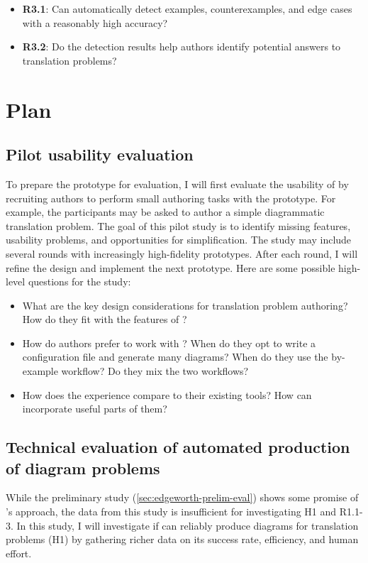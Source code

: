 \begin{itemize}
    \item \textbf{R3.1}: Can \Edgeworth automatically detect examples, counterexamples, and edge cases with a reasonably high accuracy?
    \item \textbf{R3.2}: Do the detection results help authors identify potential answers to translation problems?
\end{itemize}


\section{Plan}

\subsection{Pilot usability evaluation}

To prepare the \Edgeworth prototype for evaluation, I will first evaluate the usability of \Edgeworth by recruiting authors to perform small authoring tasks with the \Edgeworth prototype. For example, the participants may be asked to author a simple diagrammatic translation problem. The goal of this pilot study is to identify missing features, usability problems, and opportunities for simplification. The study may include several rounds with increasingly high-fidelity prototypes. After each round, I will refine the design and implement the next prototype. Here are some possible high-level questions for the study:
\begin{itemize}
    \item What are the key design considerations for translation problem authoring? How do they fit with the features of \Edgeworth?
    \item How do authors prefer to work with \Edgeworth? When do they opt to write a configuration file and generate many diagrams? When do they use the by-example workflow? Do they mix the two workflows?
    \item How does the experience compare to their existing tools? How can \Edgeworth incorporate useful parts of them? 
\end{itemize}

\subsection{Technical evaluation of automated production of diagram problems}
\label{sec:case-study}

While the preliminary study (\cref{sec:edgeworth-prelim-eval}) shows some promise of \Edgeworth's approach, the data from this study is insufficient for investigating H1 and R1.1-3. In this study, I will investigate if \Edgeworth can reliably produce diagrams for translation problems (H1) by gathering richer data on its success rate, efficiency, and human effort. 

